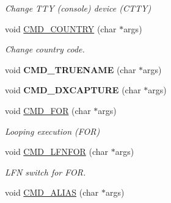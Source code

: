 \begin{DoxyCompactItemize}
\begin{DoxyCompactList}\small\item\em Change T\-T\-Y (console) device (C\-T\-T\-Y) \end{DoxyCompactList}\item 
\hypertarget{classDOS__Shell_ac340d6c4d6901c3b7c4f5417103d8722}{void \hyperlink{classDOS__Shell_ac340d6c4d6901c3b7c4f5417103d8722}{C\-M\-D\-\_\-\-C\-O\-U\-N\-T\-R\-Y} (char $\ast$args)}\label{classDOS__Shell_ac340d6c4d6901c3b7c4f5417103d8722}

\begin{DoxyCompactList}\small\item\em Change country code. \end{DoxyCompactList}\item 
\hypertarget{classDOS__Shell_ae29328b82e817beedd09c15d358b22cc}{void {\bfseries C\-M\-D\-\_\-\-T\-R\-U\-E\-N\-A\-M\-E} (char $\ast$args)}\label{classDOS__Shell_ae29328b82e817beedd09c15d358b22cc}

\item 
\hypertarget{classDOS__Shell_af83074f3b9cbccf5265a95ad780311e5}{void {\bfseries C\-M\-D\-\_\-\-D\-X\-C\-A\-P\-T\-U\-R\-E} (char $\ast$args)}\label{classDOS__Shell_af83074f3b9cbccf5265a95ad780311e5}

\item 
\hypertarget{classDOS__Shell_a0d8acfd37eae2734a4a2cf623eafa536}{void \hyperlink{classDOS__Shell_a0d8acfd37eae2734a4a2cf623eafa536}{C\-M\-D\-\_\-\-F\-O\-R} (char $\ast$args)}\label{classDOS__Shell_a0d8acfd37eae2734a4a2cf623eafa536}

\begin{DoxyCompactList}\small\item\em Looping execution (F\-O\-R) \end{DoxyCompactList}\item 
\hypertarget{classDOS__Shell_ac3e02056a7d64e3b1630b85d9b052ac2}{void \hyperlink{classDOS__Shell_ac3e02056a7d64e3b1630b85d9b052ac2}{C\-M\-D\-\_\-\-L\-F\-N\-F\-O\-R} (char $\ast$args)}\label{classDOS__Shell_ac3e02056a7d64e3b1630b85d9b052ac2}

\begin{DoxyCompactList}\small\item\em L\-F\-N switch for F\-O\-R. \end{DoxyCompactList}\item 
\hypertarget{classDOS__Shell_abd92148be3bd428f99d0f101af74f874}{void \hyperlink{classDOS__Shell_abd92148be3bd428f99d0f101af74f874}{C\-M\-D\-\_\-\-A\-L\-I\-A\-S} (char $\ast$args)}\label{classDOS__Shell_abd92148be3bd428f99d0f101af74f874}


\end{DoxyCompactItemize}
